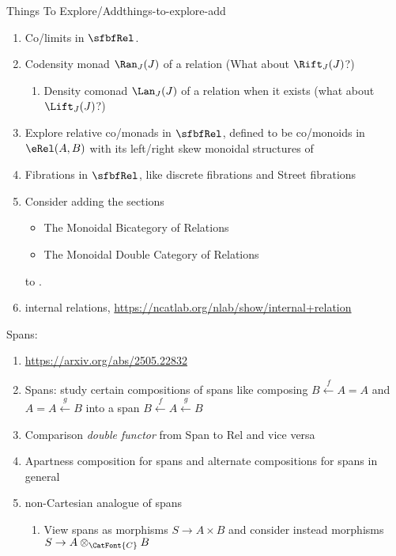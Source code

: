 \begin{remark}{Things To Explore/Add}{things-to-explore-add}
\begin{enumerate}
        \item Co/limits in $\sfbfRel$.
        \item Codensity monad $\Ran_{J}(J)$ of a relation (What about $\Rift_{J}(J)$?)
            \begin{enumerate}
                \item Density comonad $\Lan_{J}(J)$ of a relation when it exists (what about $\Lift_{J}(J)$?)
            \end{enumerate}
        \item Explore relative co/monads in $\sfbfRel$, defined to be co/monoids in $\eRel(A,B)$ with its left/right skew monoidal structures of 
        \item Fibrations in $\sfbfRel$, like discrete fibrations and Street fibrations
        \item Consider adding the sections
            \begin{itemize}
                \item The Monoidal Bicategory of Relations
                \item The Monoidal Double Category of Relations
            \end{itemize}
            to \ChapterRelations.
        \item internal relations, \url{https://ncatlab.org/nlab/show/internal+relation}
    \end{enumerate}
    Spans:
    \begin{enumerate}
        \item \url{https://arxiv.org/abs/2505.22832}
        \item Spans: study certain compositions of spans like composing $B\xleftarrow{f}A=A$ and $A=A\xleftarrow{g}B$ into a span $B\xleftarrow{f}A\xleftarrow{g}B$
        \item Comparison \emph{double functor} from Span to Rel and vice versa
        \item Apartness composition for spans and alternate compositions for spans in general
        \item non-Cartesian analogue of spans
            \begin{enumerate}
                \item View spans as morphisms $S\to A\times B$ and consider instead morphisms $S\to A\otimes_{\CatFont{C}}B$

\end{enumerate}
\end{enumerate}
\end{remark}
